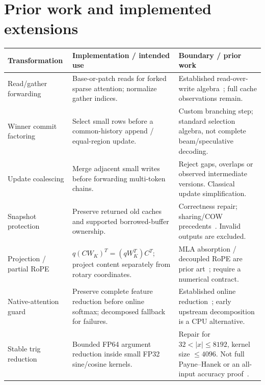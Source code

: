 \documentclass[10pt,a4paper]{article}
\begin{document}
\section{Prior work and implemented extensions}
{\small
\begin{tabularx}{\linewidth}{@{}P{30mm}YY@{}}
\toprule
\textbf{Transformation} & \textbf{Implementation / intended use} & \textbf{Boundary / prior work}\\
\midrule
Read/gather forwarding & Base-or-patch reads for forked sparse attention; normalize gather indices. & Established read-over-write algebra~\cite{mccarthy,arrays}; full cache observations remain.\\
Winner commit factoring & Select small rows before a common-history append / equal-region update. & Custom branching step; standard selection algebra, not complete beam/speculative decoding.\\
Update coalescing & Merge adjacent small writes before forwarding multi-token chains. & Reject gaps, overlaps or observed intermediate versions. Classical update simplification.\\
Snapshot protection & Preserve returned old caches and supported borrowed-buffer ownership. & Correctness repair; sharing/COW precedents~\cite{paged,forkkv}. Invalid outputs are excluded.\\
Projection / partial RoPE & $q(CW_K)^T=(qW_K^T)C^T$; project content separately from rotary coordinates. & MLA absorption / decoupled RoPE are prior art~\cite{deepseek,rope}; require a numerical contract.\\
Native-attention guard & Preserve complete feature reduction before online softmax; decomposed fallback for failures. & Established online reduction~\cite{online,flash}; early upstream decomposition is a CPU alternative.\\
Stable trig reduction & Bounded FP64 argument reduction inside small FP32 sine/cosine kernels. & Repair for $32<|x|\leq8192$, kernel size $\leq4096$. Not full Payne--Hanek or an all-input accuracy proof~\cite{payne}.\\
\bottomrule
\end{tabularx}}
\end{document}
